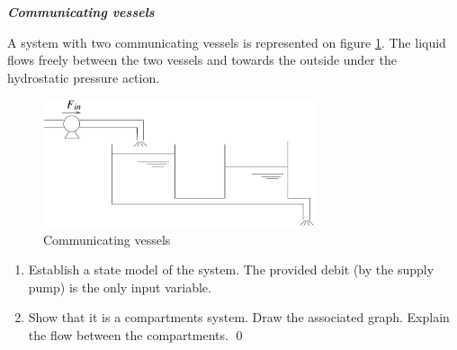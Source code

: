 \begin{exercice}{\bf \em Communicating vessels}

A system with two communicating vessels is represented on figure \ref{Fig:reservoircom}.
The liquid flows freely between the two vessels and towards the outside under the hydrostatic pressure action.

\begin{figure}[h]
\begin{center}
\includegraphics[width=8cm]{reservoircom}
\caption{Communicating vessels}
\label{Fig:reservoircom}
\end{center} 
\end{figure}

\begin{enumerate}
\item Establish a state model of the system. The provided debit (by the supply pump) is the only input variable. 
\item Show that it is a compartments system. Draw the associated graph. Explain the flow between the compartments. \qed
\end{enumerate}
\end{exercice}


